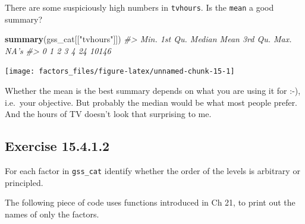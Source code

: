 \documentclass[]{book}
\newenvironment{Shaded}{\begin{snugshade}}{\end{snugshade}}
\newcommand{\CommentTok}[1]{\textcolor[rgb]{0.56,0.35,0.01}{\textit{#1}}}
\newcommand{\DataTypeTok}[1]{\textcolor[rgb]{0.13,0.29,0.53}{#1}}
\newcommand{\DecValTok}[1]{\textcolor[rgb]{0.00,0.00,0.81}{#1}}
\newcommand{\KeywordTok}[1]{\textcolor[rgb]{0.13,0.29,0.53}{\textbf{#1}}}
\newcommand{\NormalTok}[1]{#1}
\newcommand{\OperatorTok}[1]{\textcolor[rgb]{0.81,0.36,0.00}{\textbf{#1}}}
\newcommand{\StringTok}[1]{\textcolor[rgb]{0.31,0.60,0.02}{#1}}
\theoremstyle{plain}
\theoremstyle{remark}
\begin{document}
There are some suspiciously high numbers in \texttt{tvhours}.
Is the \texttt{mean} a good summary?

\begin{Shaded}
\begin{Highlighting}[]
\KeywordTok{summary}\NormalTok{(gss_cat[[}\StringTok{"tvhours"}\NormalTok{]])}
\CommentTok{#>    Min. 1st Qu.  Median    Mean 3rd Qu.    Max.    NA's }
\CommentTok{#>       0       1       2       3       4      24   10146}
\end{Highlighting}
\end{Shaded}

\begin{Shaded}
\end{Shaded}

\begin{center}\texttt{[image: factors\_files/figure-latex/unnamed-chunk-15-1]} \end{center}

Whether the mean is the best summary depends on what you are using it for :-), i.e.~your objective.
But probably the median would be what most people prefer.
And the hours of TV doesn't look that surprising to me.

\hypertarget{exercise-15.4.1.2}{%
\subsection*{\texorpdfstring{Exercise {15.4.1.2}}{Exercise 15.4.1.2}}\label{exercise-15.4.1.2}}

For each factor in \texttt{gss\_cat} identify whether the order of the levels is arbitrary or principled.

The following piece of code uses functions introduced in Ch 21, to print out the names of only the factors.

\begin{Shaded}
\end{Shaded}
\end{document}
